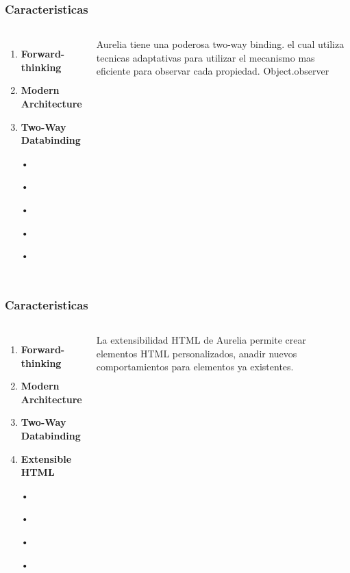 \documentclass{beamer}
\begin{document}
\begin{frame}
\frametitle{Caracteristicas}
\begin{columns}[c] %

\begin{enumerate}
\item \textbf{Forward-thinking}
\item \textbf{Modern Architecture}
\item \textbf{Two-Way Databinding}
\item[•]	
\item[•]	
\item[•]	
\item[•]	
\item[•]	
\end{enumerate}

Aurelia tiene una poderosa two-way binding. el cual utiliza tecnicas adaptativas para utilizar el mecanismo mas eficiente para observar cada propiedad. Object.observer
\end{columns}
\end{frame}

\begin{frame}
\frametitle{Caracteristicas}
\begin{columns}[c] %

\begin{enumerate}
\item \textbf{Forward-thinking}
\item \textbf{Modern Architecture}
\item \textbf{Two-Way Databinding}
\item \textbf{Extensible HTML}
\item[•]	
\item[•]	
\item[•]	
\item[•]	
\end{enumerate}

La extensibilidad HTML de Aurelia permite crear elementos HTML personalizados, anadir nuevos comportamientos para elementos ya existentes.
\end{columns}
\end{frame}
\end{document}
